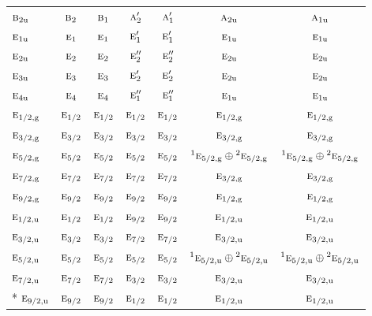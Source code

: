 \documentclass[10pt,a4paper]{article}
\numberwithin{equation}{section}
\newcommand{\irr}[1]{\text{\normalfont\scshape #1}}
\newcommand{\conjpair}[1]{{}^{#1}}
\newcommand{\ptag}[1]{\mathrm{#1}}
\begin{document}
{\begin{longtable}{@{}lcccccc@{}}
$\irr{b}_{2\ptag{u}}$ & $\irr{b}_{2}$ & $\irr{b}_{1}$ & $\irr{a}_{2}'$ & $\irr{a}_{1}'$ & $\irr{a}_{2\ptag{u}}$ & $\irr{a}_{1\ptag{u}}$\\
$\irr{e}_{1\ptag{u}}$ & $\irr{e}_{1}$ & $\irr{e}_{1}$ & $\irr{e}_{1}'$ & $\irr{e}_{1}'$ & $\irr{e}_{1\ptag{u}}$ & $\irr{e}_{1\ptag{u}}$\\
$\irr{e}_{2\ptag{u}}$ & $\irr{e}_{2}$ & $\irr{e}_{2}$ & $\irr{e}_{2}''$ & $\irr{e}_{2}''$ & $\irr{e}_{2\ptag{u}}$ & $\irr{e}_{2\ptag{u}}$\\
$\irr{e}_{3\ptag{u}}$ & $\irr{e}_{3}$ & $\irr{e}_{3}$ & $\irr{e}_{2}'$ & $\irr{e}_{2}'$ & $\irr{e}_{2\ptag{u}}$ & $\irr{e}_{2\ptag{u}}$\\
$\irr{e}_{4\ptag{u}}$ & $\irr{e}_{4}$ & $\irr{e}_{4}$ & $\irr{e}_{1}''$ & $\irr{e}_{1}''$ & $\irr{e}_{1\ptag{u}}$ & $\irr{e}_{1\ptag{u}}$\\
$\irr{e}_{1/2,\ptag{g}}$ & $\irr{e}_{1/2}$ & $\irr{e}_{1/2}$ & $\irr{e}_{1/2}$ & $\irr{e}_{1/2}$ & $\irr{e}_{1/2,\ptag{g}}$ & $\irr{e}_{1/2,\ptag{g}}$\\
$\irr{e}_{3/2,\ptag{g}}$ & $\irr{e}_{3/2}$ & $\irr{e}_{3/2}$ & $\irr{e}_{3/2}$ & $\irr{e}_{3/2}$ & $\irr{e}_{3/2,\ptag{g}}$ & $\irr{e}_{3/2,\ptag{g}}$\\
$\irr{e}_{5/2,\ptag{g}}$ & $\irr{e}_{5/2}$ & $\irr{e}_{5/2}$ & $\irr{e}_{5/2}$ & $\irr{e}_{5/2}$ & $\conjpair{1}\irr{e}_{5/2,\ptag{g}}\oplus \conjpair{2}\irr{e}_{5/2,\ptag{g}}$ & $\conjpair{1}\irr{e}_{5/2,\ptag{g}}\oplus \conjpair{2}\irr{e}_{5/2,\ptag{g}}$\\
$\irr{e}_{7/2,\ptag{g}}$ & $\irr{e}_{7/2}$ & $\irr{e}_{7/2}$ & $\irr{e}_{7/2}$ & $\irr{e}_{7/2}$ & $\irr{e}_{3/2,\ptag{g}}$ & $\irr{e}_{3/2,\ptag{g}}$\\
$\irr{e}_{9/2,\ptag{g}}$ & $\irr{e}_{9/2}$ & $\irr{e}_{9/2}$ & $\irr{e}_{9/2}$ & $\irr{e}_{9/2}$ & $\irr{e}_{1/2,\ptag{g}}$ & $\irr{e}_{1/2,\ptag{g}}$\\
$\irr{e}_{1/2,\ptag{u}}$ & $\irr{e}_{1/2}$ & $\irr{e}_{1/2}$ & $\irr{e}_{9/2}$ & $\irr{e}_{9/2}$ & $\irr{e}_{1/2,\ptag{u}}$ & $\irr{e}_{1/2,\ptag{u}}$\\
$\irr{e}_{3/2,\ptag{u}}$ & $\irr{e}_{3/2}$ & $\irr{e}_{3/2}$ & $\irr{e}_{7/2}$ & $\irr{e}_{7/2}$ & $\irr{e}_{3/2,\ptag{u}}$ & $\irr{e}_{3/2,\ptag{u}}$\\
$\irr{e}_{5/2,\ptag{u}}$ & $\irr{e}_{5/2}$ & $\irr{e}_{5/2}$ & $\irr{e}_{5/2}$ & $\irr{e}_{5/2}$ & $\conjpair{1}\irr{e}_{5/2,\ptag{u}}\oplus \conjpair{2}\irr{e}_{5/2,\ptag{u}}$ & $\conjpair{1}\irr{e}_{5/2,\ptag{u}}\oplus \conjpair{2}\irr{e}_{5/2,\ptag{u}}$\\
$\irr{e}_{7/2,\ptag{u}}$ & $\irr{e}_{7/2}$ & $\irr{e}_{7/2}$ & $\irr{e}_{3/2}$ & $\irr{e}_{3/2}$ & $\irr{e}_{3/2,\ptag{u}}$ & $\irr{e}_{3/2,\ptag{u}}$\\*
$\irr{e}_{9/2,\ptag{u}}$ & $\irr{e}_{9/2}$ & $\irr{e}_{9/2}$ & $\irr{e}_{1/2}$ & $\irr{e}_{1/2}$ & $\irr{e}_{1/2,\ptag{u}}$ & $\irr{e}_{1/2,\ptag{u}}$\\
\bottomrule\end{longtable}}
\end{document}
